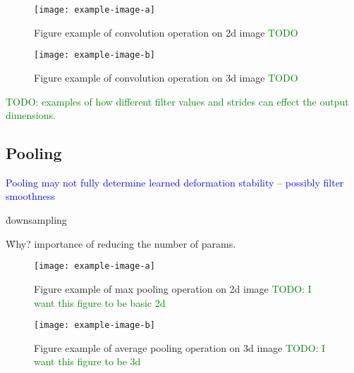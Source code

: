 \begin{figure}[htp]
	\centering
	\texttt{[image: example-image-a]}\hfil
	\caption{Figure example of convolution operation on 2d image \textcolor{green}{TODO}}
	\label{fig:conv_2d_example_calc}
\end{figure}

\begin{figure}[htp]
	\centering
	\texttt{[image: example-image-b]}\hfil
	\caption{Figure example of convolution operation on 3d image \textcolor{green}{TODO}}
	\label{fig:conv_2d_depth_example_calc}
\end{figure}

\textcolor{green}{TODO: examples of how different filter values and strides can effect the output dimensions.}


\subsection{Pooling}


\textcolor{blue}{Pooling may not fully determine learned deformation stability -- possibly filter smoothness\cite{ruderman2018learned}}

\r{downsampling}

\r{Why? importance of reducing the number of params.}

\begin{figure}[htp]
	\centering
	\texttt{[image: example-image-a]}\hfil
	\caption{Figure example of max pooling operation on 2d image \textcolor{green}{TODO: I want this figure to be basic 2d}}
	\label{fig:pooling_max_2d_ex_a}
\end{figure}

\begin{figure}[htp]
	\centering
	\texttt{[image: example-image-b]}\hfil
	\caption{Figure example of average pooling operation on 3d image \textcolor{green}{TODO: I want this figure to be 3d}}
	\label{fig:pooling_avg_3d_ex_a}
\end{figure}